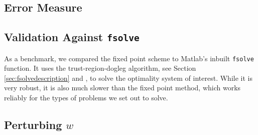 \documentclass[11pt, a4paper]{article}
\theoremstyle{definition}
\begin{document}
	\subsection{Error Measure}\label{sec:ErrorMeasure}
	
	
	
	\subsection{Validation Against \texttt{fsolve}}
	As a benchmark, we compared the fixed point scheme to Matlab's inbuilt \texttt{fsolve} function. It uses the trust-region-dogleg algorithm, see Section \ref{sec:fsolvedescription} and \cite{Powell1}, to solve the optimality system of interest. While it is very robust, it is also much slower than the fixed point method, which works reliably for the types of problems we set out to solve. 
	
	
	
	\subsection{Perturbing $w$}
	
	
\end{document}
